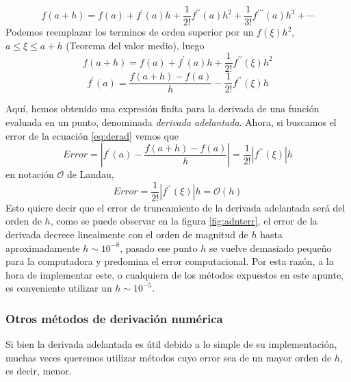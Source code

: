 \begin{equation}
  f(a + h) = f(a) + f^{\prime}(a)h + \frac{1}{2!}f^{\prime \prime}(a)h^{2} + \frac{1}{3!}f^{\prime \prime \prime}(a)h^{3} + \cdots
\end{equation}
Podemos reemplazar los terminos de orden superior por un $f(\xi)h^{2}$, $a \leq \xi \leq a + h$ (Teorema del valor medio), luego
\begin{equation}
  f(a + h) = f(a) + f^{\prime}(a)h + \frac{1}{2!}f^{\prime \prime}(\xi)h^{2}
\end{equation}
\begin{equation} \label{eq:derad}
  f^{\prime}(a) = \frac{f(a + h) - f(a)}{h} - \frac{1}{2!}f^{\prime \prime}(\xi)h
\end{equation}

Aquí, hemos obtenido una expresión finíta para la derivada de una función evaluada en un punto, denominada \textit{derivada adelantada}. Ahora, si buscamos el error de la ecuación \eqref{eq:derad} vemos que
\begin{equation}
  Error =  \left| f^{\prime}(a) - \frac{f(a+h) - f(a)}{h} \right| = \frac{1}{2!}\left| f^{\prime \prime}(\xi) \right| h
\end{equation}
en notación $\mathcal{O}$ de Landau, 
\begin{equation}
  Error = \frac{1}{2!}\left| f^{\prime \prime}(\xi) \right| h = \mathcal{O}(h)
\end{equation}
Esto quiere decir que el error de truncamiento de la derivada adelantada será del orden de $h$, como se puede observar en la figura \ref{fig:adnterr}, el error de la derivada decrece linealmente con el orden de magnitud de $h$ hasta aproximadamente $h \sim 10^{-8}$, pasado ese punto $h$ se vuelve demasiado pequeño para la computadora y predomina el error computacional. Por esta razón, a la hora de implementar este, o cualquiera de los métodos expuestos en este apunte, es conveniente utilizar un $h \sim 10^{-5}$. 


\subsubsection{Otros métodos de derivación numérica}

Si bien la derivada adelantada es útil debido a lo simple de su implementación, muchas veces queremos utilizar métodos cuyo error sea de un mayor orden de $h$, es decir, menor.

